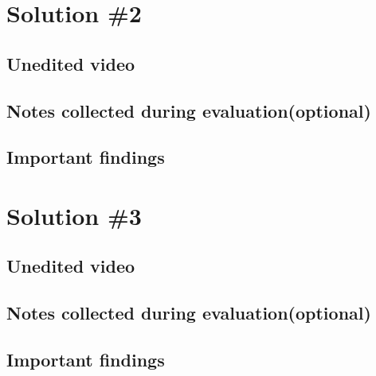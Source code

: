 \documentclass[a4paper,10pt,oneside]{scrreprt}
\begin{document}
\section{Solution \#2}
\subsection{Unedited video}

\subsection{Notes collected during evaluation(optional)}

\subsection{Important findings}

\section{Solution \#3}
\subsection{Unedited video}

\subsection{Notes collected during evaluation(optional)}

\subsection{Important findings}
\end{document}

